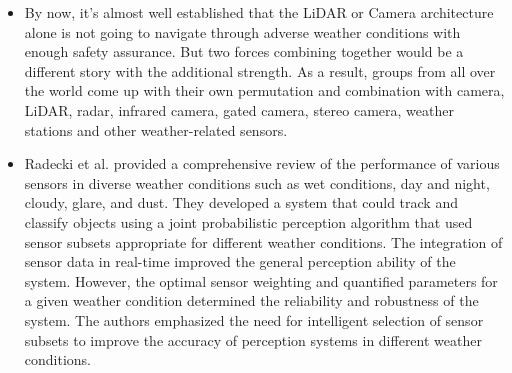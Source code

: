 \documentclass[rnd]{mas_proposal}
\begin{document}
\begin{itemize}
      \item By now, it’s almost well established that the LiDAR or Camera architecture alone is not going to navigate through adverse weather conditions with enough safety assurance. But two forces combining together would be a different story with the additional strength. As a result, groups from all over the world come up with their own permutation and combination with camera, LiDAR, radar, infrared camera, gated camera, stereo camera, weather stations and other weather-related sensors.

      
      \item Radecki et al. \cite{radecki2016all} provided a comprehensive review of the performance of various sensors in diverse weather conditions such as wet conditions, day and night, cloudy, glare, and dust. They developed a system that could track and classify objects using a joint probabilistic perception algorithm that used sensor subsets appropriate for different weather conditions. The integration of sensor data in real-time improved the general perception ability of the system. However, the optimal sensor weighting and quantified parameters for a given weather condition determined the reliability and robustness of the system. The authors emphasized the need for intelligent selection of sensor subsets to improve the accuracy of perception systems in different weather conditions.
      

\end{itemize}
\end{document}
